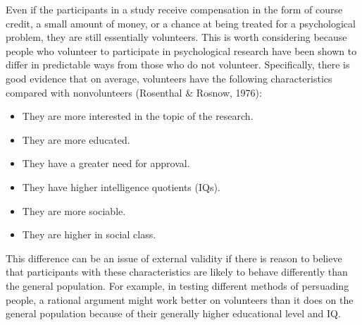 \color{fgcolor}\begin{kframe}


Even if the participants in a study receive compensation in the form of course credit, a small amount of money, or a chance at being treated for a psychological problem, they are still essentially volunteers. This is worth considering because people who volunteer to participate in psychological research have been shown to differ in predictable ways from those who do not volunteer. Specifically, there is good evidence that on average, volunteers have the following characteristics compared with nonvolunteers (Rosenthal \& Rosnow, 1976):
 

\begin{itemize}
\item They are more interested in the topic of the research.
\item They are more educated.
\item They have a greater need for approval.
\item They have higher intelligence quotients (IQs).
\item They are more sociable.
\item They are higher in social class.
\end{itemize}

This difference can be an issue of external validity if there is reason to believe that participants with these characteristics are likely to behave differently than the general population. For example, in testing different methods of persuading people, a rational argument might work better on volunteers than it does on the general population because of their generally higher educational level and IQ.

\end{kframe}

